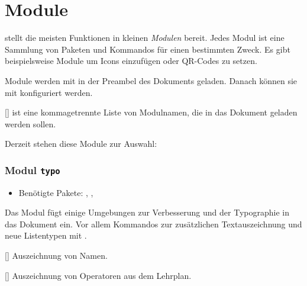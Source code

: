 
\part{Module}\label{part:module}

 stellt die meisten Funktionen in kleinen
\emph{Modulen} bereit. Jedes Modul ist eine Sammlung von
Paketen und Kommandos für einen bestimmten Zweck. Es gibt
beispielsweise Module um Icons einzufügen oder QR-Codes zu
setzen.

Module werden mit  in der Preambel des Dokuments
geladen. Danach können sie mit  konfiguriert werden.

\begin{commands}
	[]
	 ist eine kommagetrennte Liste von Modulnamen,
	die in das Dokument geladen werden sollen.

	Derzeit stehen diese Module zur Auswahl:
	\def\do#1{\module*{#1}, }
	\dolistloop{\listAlleModule}
\end{commands}

\section{Modul \texttt{typo}}\label{sec:modul-typo}
\begin{itemize}
	\item Benötigte Pakete: , , 
\end{itemize}

Das Modul  fügt einige Umgebungen zur  Verbesserung und
der Typographie in das Dokument ein. Vor allem Kommandos zur zusätzlichen
Textauszeichnung und neue Listentypen mit .

\begin{commands}
	[]
	Auszeichnung von Namen.

	\begin{example}[side-by-side,add-silent-cmds={person}]
  \end{example}

	[]
	Auszeichnung von Operatoren aus dem Lehrplan.

	\begin{example}[side-by-side,add-silent-cmds={operator}]
  \end{example}
\end{commands}

